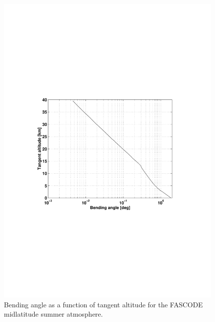    \begin{figure}
    \begin{center}
      \includegraphics*{Figs/fig_bendingangle}
      \caption{Bending angle as a function of tangent altitude for the FASCODE 
               midlatitude summer atmosphere. } 
      \label{fig:los:snell} 
    \end{center} 
  \end{figure}


